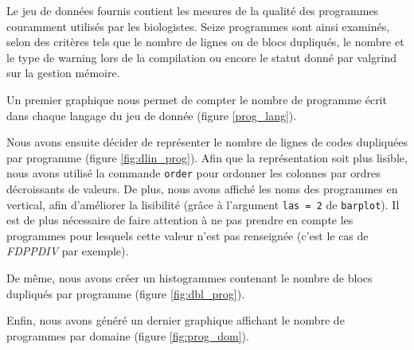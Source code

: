 Le jeu de données fournis contient les mesures de la qualité des
programmes couramment utilisés par les biologistes. Seize programmes
sont ainsi examinés, selon des critères tels que le nombre de lignes ou
de blocs dupliqués, le nombre et le type de warning lors de la
compilation ou encore le statut donné par valgrind sur la gestion
mémoire.

Un premier graphique nous permet de compter le nombre de programme
écrit dans chaque langage du jeu de donnée (figure \ref{prog_lang}).


Nous avons ensuite décider de représenter le nombre de lignes de codes
dupliquées par programme (figure \ref{fig:dlin_prog}). Afin que la
représentation soit plus lisible, nous avons utilisé la commande
\lstinline{order} pour ordonner les colonnes par ordres décroissants
de valeurs. De plus, nous avons affiché les noms des programmes en
vertical, afin d'améliorer la lisibilité (grâce à l'argument
\lstinline{las = 2} de \lstinline{barplot}). Il est de plus nécessaire
de faire attention à ne pas prendre en compte les programmes pour
lesquels cette valeur n'est pas renseignée (c'est le cas de \emph{FDPPDIV}
par exemple).


De même, nous avons créer un histogrammes contenant le nombre de blocs
dupliqués par programme (figure \ref{fig:dbl_prog}).


Enfin, nous avons généré un dernier graphique affichant le nombre de
programmes par domaine (figure \ref{fig:prog_dom}).


